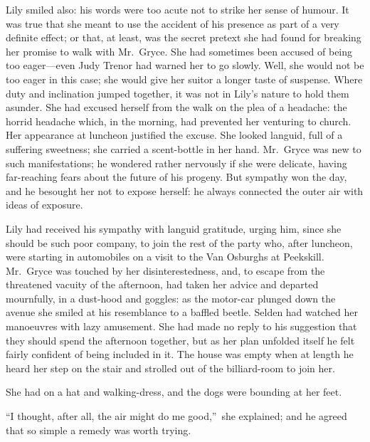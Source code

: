 \documentclass[12pt,a4paper]{book}
\begin{document}
Lily smiled also: his words were too acute not to strike her
sense of humour. It was true that she meant to use the accident
of his presence as part of a very definite effect; or that, at
least, was the secret pretext she had found for breaking her
promise to walk with Mr.\ Gryce. She had sometimes been accused of
being too eager---even Judy Trenor had warned her to go slowly. 
Well, she would not be too eager in this case; she would give her
suitor a longer taste of suspense. Where duty and inclination
jumped together, it was not in Lily's nature to hold them
asunder. She had excused herself from the walk on the plea of a
headache: the horrid headache which, in the morning, had
prevented her venturing to church. Her appearance at luncheon
justified the excuse. She looked languid, full of a suffering
sweetness; she carried a scent-bottle in her hand. Mr.\ Gryce was
new to such manifestations; he wondered rather nervously if she
were delicate, having far-reaching fears about the future of his
progeny. But sympathy won the day, and he besought her not to
expose herself: he always connected the outer air with ideas of
exposure.





Lily had received his sympathy with languid gratitude, urging
him, since she should be such poor company, to join the rest of
the party who, after luncheon, were starting in automobiles on a
visit to the Van Osburghs at Peekskill. Mr.\ Gryce was touched by
her disinterestedness, and, to escape from the threatened vacuity
of the afternoon, had taken her advice and departed mournfully,
in a dust-hood and goggles: as the motor-car plunged down the
avenue she smiled at his resemblance to a baffled beetle. Selden
had watched her manoeuvres with lazy amusement. She had made no
reply to his suggestion that they should spend the
afternoon together, but as her plan unfolded itself he felt
fairly confident of being included in it. The house was empty
when at length he heard her step on the stair and strolled out of
the billiard-room to join her.





She had on a hat and walking-dress, and the dogs were bounding at
her feet.





``I thought, after all, the air might do me good,''\ she explained;
and he agreed that so simple a remedy was worth trying.
\end{document}
